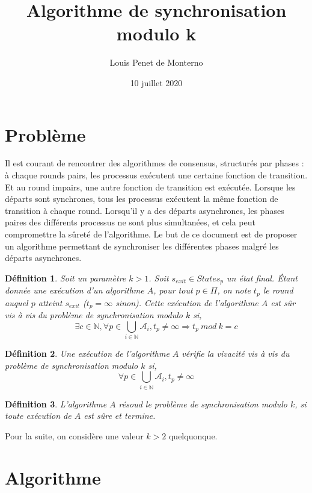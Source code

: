 \documentclass{article}
\title{Algorithme de synchronisation modulo k}
\date{10 juillet 2020}
\author{Louis Penet de Monterno}
\newtheorem{definition}{Définition}
\begin{document}
\maketitle

\section{Problème}

Il est courant de rencontrer des algorithmes de consensus, structurés par phases : 
à chaque rounds pairs, les processus exécutent une certaine fonction de transition. Et au round impairs, une autre fonction de transition est exécutée.
Lorsque les départs sont synchrones, tous les processus exécutent la même fonction de transition à chaque round.
Lorsqu'il y a des départs asynchrones, les phases paires des différents processus ne sont plus simultanées, et cela peut compromettre la sûreté de l'algorithme.
Le but de ce document est de proposer un algorithme permettant de synchroniser les différentes phases malgré les départs asynchrones.

\begin{definition}

	Soit un paramètre $k > 1$. Soit $s_{exit} \in States_p$ un état final.
	Étant donnée une exécution d'un algorithme $A$, pour tout $p \in \Pi$, on note $t_p$ le round auquel $p$ atteint $s_{exit}$ ($t_p = \infty$ sinon).
	Cette exécution de l'algorithme $A$ est sûr vis à vis du problème de synchronisation modulo $k$ si,
	$$\exists c \in \mathds{N}, \forall p \in \bigcup\limits_{i \in \mathds{N}} \mathcal{A}_i, t_p \neq \infty \Rightarrow t_p~mod~k = c$$

\end{definition}

\begin{definition}

	Une exécution de l'algorithme $A$ vérifie la vivacité vis à vis du problème de synchronisation modulo $k$ si,
	$$\forall p \in \bigcup\limits_{i \in \mathds{N}} \mathcal{A}_i, t_p \neq \infty$$

\end{definition}
\begin{definition}
	L'algorithme $A$ résoud le problème de synchronisation modulo $k$, si toute exécution de $A$ est sûre et termine.
\end{definition}

Pour la suite, on considère une valeur $k > 2$ quelquonque.

\section{Algorithme}
\end{document}
